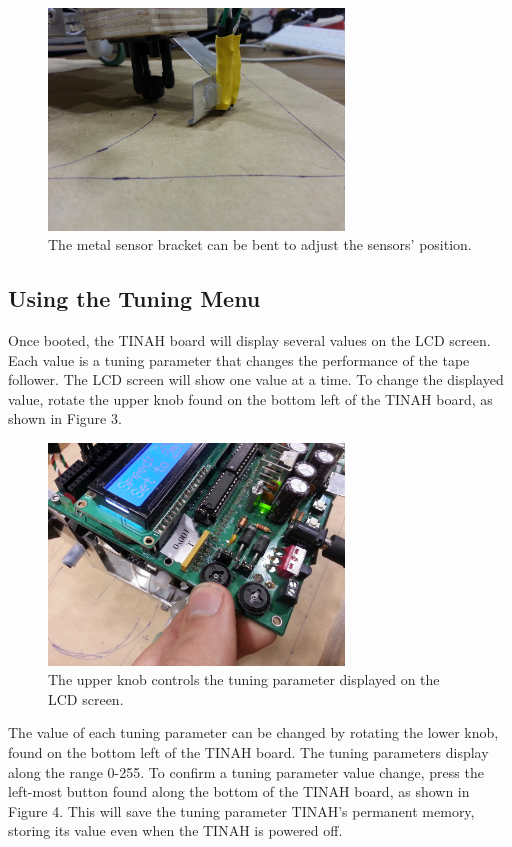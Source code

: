 \documentclass[11pt]{article}
\begin{document}
\begin{adjustwidth}{1cm}{}
	\begin{figure}[h]
	\centering
		\includegraphics[width=0.7\textwidth]{Figures/reflectance_sensors.jpg}
		\caption{The metal sensor bracket can be bent to adjust the sensors' position.}
	\end{figure}

\subsection{Using the Tuning Menu}

	Once booted, the TINAH board will display several values on the LCD screen. Each value is a tuning parameter that changes the performance of the tape follower. The LCD screen will show one value at a time. To change the displayed value, rotate the upper knob found on the bottom left of the TINAH board, as shown in Figure 3.

	\begin{figure}[h]
	\centering
		\includegraphics[width=0.7\textwidth]{Figures/knobs.jpg}
		\caption{The upper knob controls the tuning parameter displayed on the LCD screen.}
	\end{figure}

	The value of each tuning parameter can be changed by rotating the lower knob, found on the bottom left of the TINAH board.  The tuning parameters display along the range 0-255.  To confirm a tuning parameter value change, press the left-most button found along the bottom of the TINAH board, as shown in Figure 4. This will save the tuning parameter TINAH's permanent memory, storing its value even when the TINAH is powered off.
	

\end{adjustwidth}
\end{document}
